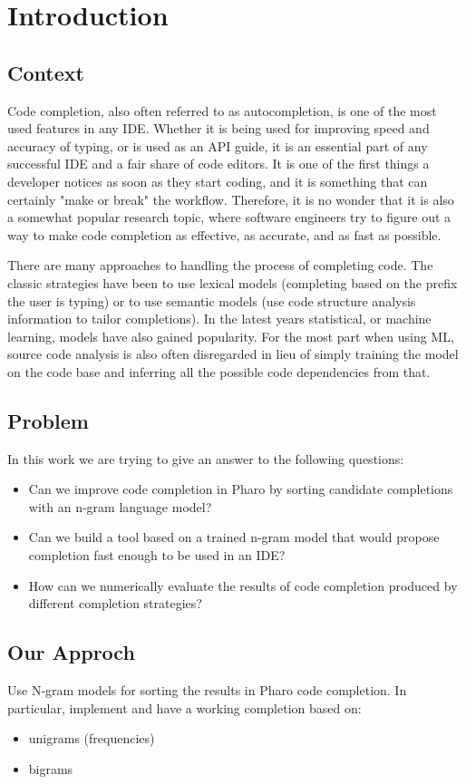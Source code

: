 \chapter{Introduction}
\label{chap:Introduction}

\section{Context}
Code completion, also often referred to as autocompletion, is one of the most
used features in any IDE. Whether it is being used for improving speed and
accuracy of typing, or is used as an API guide, it is an essential part of any
successful IDE and a fair share of code editors. It is one of the first things
a developer notices as soon as they start coding, and it is something that can
certainly "make or break" the workflow. Therefore, it is no wonder that it is
also a somewhat popular research topic, where software engineers try to figure out
a way to make code completion as effective, as accurate, and as fast as possible.

There are many approaches to handling the process of completing code. The classic
strategies have been to use lexical models (completing based on the prefix the user
is typing) or to use semantic models (use code structure analysis information to
tailor completions). In the latest years statistical, or machine learning, models
have also gained popularity. For the most part when using ML, source code analysis
is also often disregarded in lieu of simply training the model on the code base and
inferring all the possible code dependencies from that.

\section{Problem}
\label{sec:Introduction-Problem}
In this work we are trying to give an answer to the following questions:
\begin{itemize}
    \item Can we improve code completion in Pharo by sorting candidate completions
    with an n-gram language model?
    \item Can we build a tool based on a trained n-gram model that would propose
    completion fast enough to be used in an IDE?
    \item How can we numerically evaluate the results of code completion produced
    by different completion strategies?
\end{itemize}

\section{Our Approch}
\label{sec:Introduction-Approach}
Use N-gram models for sorting the results in Pharo code completion.
In particular, implement and have a working completion based on:
\begin{itemize}
    \item unigrams (frequencies)
    \item bigrams
\end{itemize}